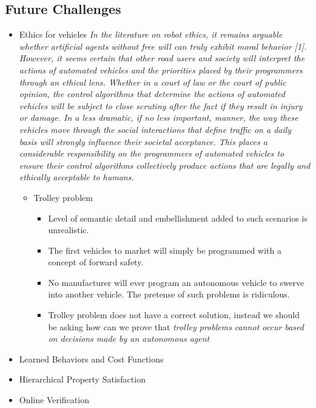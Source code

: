  \subsection{Future Challenges}
 \begin{itemize}
	 \item Ethics for vehicles
	 \emph{In the literature on robot ethics, it remains arguable whether artificial agents without free
will can truly exhibit moral behavior [1]. However, it seems certain that other road users
and society will interpret the actions of automated vehicles and the priorities placed by their
programmers through an ethical lens. Whether in a court of law or the court of public opinion,
the control algorithms that determine the actions of automated vehicles will be subject
to close scrutiny after the fact if they result in injury or damage. In a less dramatic, if no
less important, manner, the way these vehicles move through the social interactions that
define traffic on a daily basis will strongly influence their societal acceptance. This places
a considerable responsibility on the programmers of automated vehicles to ensure their
control algorithms collectively produce actions that are legally and ethically acceptable to
humans.}
		 \begin{itemize}
		 	\item Trolley problem
		 	\begin{itemize}
		 		\item Level of semantic detail and embellishment added to such scenarios is unrealistic.
		 		\item The first vehicles to market will simply be programmed with a concept of forward safety.
		 		\item No manufacturer will ever program an autonomous vehicle to swerve into another vehicle. The pretense of such problems is ridiculous.
		 		\item Trolley problem does not have a correct solution, instead we should be asking how can we prove that \emph{trolley problems cannot occur based on decisions made by an autonomous agent}
		 	\end{itemize}
		 \end{itemize}
	 \item Learned Behaviors and Cost Functions
	 \item Hierarchical Property Satisfaction
	 \item Online Verification 
 \end{itemize}